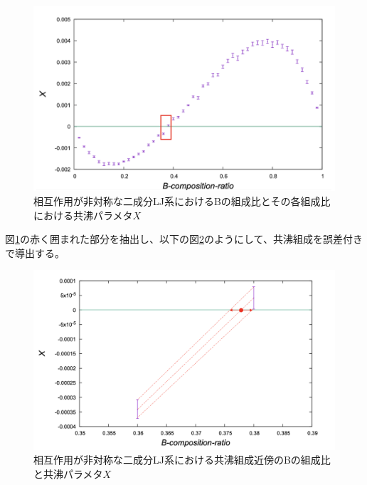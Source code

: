 \documentclass[titlepage]{jsreport}
\begin{document}
\begin{figure}[htbp]
    \begin{center}
        \includegraphics[width=14cm]{fig/bi-asymmetric-b/L100T1.0E1.05.pdf}
    \end{center}
    \caption{相互作用が非対称な二成分LJ系におけるBの組成比とその各組成比における共沸パラメタ$X$}
    \label{fig:bi-asymmetric-b}
\end{figure}

\newpage
図\ref{fig:bi-asymmetric-b}の赤く囲まれた部分を抽出し、以下の図\ref{fig:bi-asymmetric-b-part}のようにして、共沸組成を誤差付きで導出する。

\begin{figure}[htbp]
    \begin{center}
        \includegraphics[width=14cm]{fig/bi-asymmetric-b-part/L100T1.0E1.05.pdf}
    \end{center}
    \caption{相互作用が非対称な二成分LJ系における共沸組成近傍のBの組成比と共沸パラメタ$X$}
    \label{fig:bi-asymmetric-b-part}
\end{figure}
\end{document}
